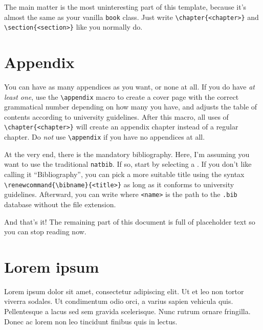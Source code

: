 \documentclass[dissertation]{msudissertation}
\begin{document}
The main matter is the most uninteresting part of this template, because it's almost the same as your vanilla \texttt{book} class.  Just write \verb|\chapter{<chapter>}| and \verb|\section{<section>}| like you normally do.

\chapter{Appendix} \label{chapter:appendix}

You can have as many appendices as you want, or none at all.  If you do have \emph{at least one}, use the \verb|\appendix| macro to create a cover page with the correct grammatical number depending on how many you have, and adjusts the table of contents according to university guidelines.  After this macro, all uses of \verb|\chapter{<chapter>}| will create an appendix chapter instead of a regular chapter.  Do \emph{not} use \verb|\appendix| if you have no appendices at all.

At the very end, there is the mandatory bibliography.  Here, I'm assuming you want to use the traditional \texttt{natbib}.  If so, start by selecting a \verb||.  If you don't like calling it ``Bibliography'', you can pick a more suitable title using the syntax \verb|\renewcommand{\bibname}{<title>}| as long as it conforms to university guidelines.  Afterward, you can write \verb|| where \texttt{<name>} is the path to the \texttt{.bib} database without the file extension.

And that's it!  The remaining part of this document is full of placeholder text so you can stop reading now.

\chapter{Lorem ipsum}

Lorem ipsum dolor sit amet, consectetur adipiscing elit. Ut et leo non tortor viverra sodales. Ut condimentum odio orci, a varius sapien vehicula quis. Pellentesque a lacus sed sem gravida scelerisque. Nunc rutrum ornare fringilla. Donec ac lorem non leo tincidunt finibus quis in lectus.\cite{exampleref1}
\end{document}
